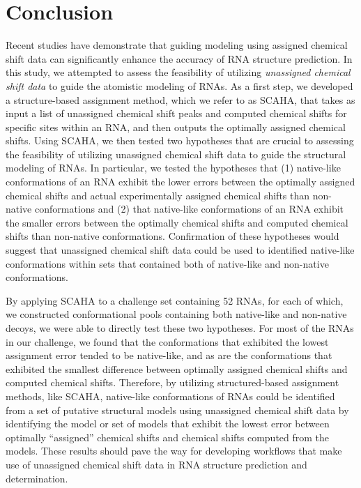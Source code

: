 \documentclass[journal=jcisd8,manuscript=article,layout=onecolumn]{achemso}
\begin{document}
\section{Conclusion}
Recent studies have demonstrate that guiding modeling  using assigned chemical shift data can significantly enhance the accuracy of RNA structure prediction. In this study, we attempted to assess the feasibility of utilizing  \textit{unassigned chemical shift data} to guide the atomistic modeling of RNAs. As a first step, we developed a structure-based assignment method, which we refer to as SCAHA, that takes as input a list of unassigned chemical shift peaks and computed chemical shifts for specific sites within an RNA, and then outputs the optimally assigned chemical shifts. Using SCAHA, we then tested two hypotheses that are crucial to assessing the feasibility of utilizing unassigned chemical shift data to guide the structural modeling of RNAs. In particular, we tested the hypotheses that (1) native-like conformations of an RNA exhibit the lower errors between the optimally assigned chemical shifts and actual experimentally assigned chemical shifts than non-native conformations and (2) that native-like conformations of an RNA exhibit the smaller errors between the optimally chemical shifts and computed chemical shifts than non-native conformations. Confirmation of these hypotheses would suggest that unassigned chemical shift data could be used to identified native-like conformations within sets that contained both of native-like and non-native conformations.

By applying SCAHA to a challenge set containing 52 RNAs, for each of which, we constructed conformational pools containing both native-like and non-native decoys, we were able to directly test these two hypotheses. For most of the RNAs in our challenge, we found that the conformations that exhibited the lowest assignment error tended to be native-like, and as are the conformations that exhibited the smallest difference between optimally assigned chemical shifts and computed chemical shifts. Therefore, by utilizing structured-based assignment methods, like SCAHA, native-like conformations of RNAs could be identified from a set of putative structural models using unassigned chemical shift data by identifying the model or set of models that exhibit the lowest error between optimally ``assigned'' chemical shifts and chemical shifts computed from the models. These results should pave the way for developing workflows that make use of unassigned chemical shift data in RNA structure prediction and determination.
\end{document}
